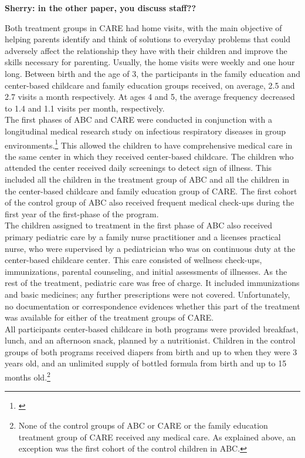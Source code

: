 \textbf{Sherry: in the other paper, you discuss staff??}

\noindent Both treatment groups in CARE had home visits, with the main objective of helping parents identify and think of solutions to everyday problems that could adversely affect the relationship they have with their children and improve the skills necessary for parenting. Usually, the home visits were weekly and one hour long. Between birth and the age of 3, the participants in the family education and center-based childcare and family education groups received, on average, 2.5 and 2.7  visits a month respectively. At ages 4 and 5, the average frequency decreased to 1.4 and 1.1 visits per month, respectively.\\ 

\noindent The first phases of ABC and CARE were conducted in conjunction with a longitudinal medical research study on infectious respiratory diseases in group environments.\footnote{\citet{Henderson-et-al_1982_NEJoM}} This allowed the children to have comprehensive medical care in the same center in which they received center-based childcare. The children who attended the center received daily screenings to detect sign of illness. This included all the children in the treatment group of ABC and all the children in the center-based childcare and family education group of CARE. The first cohort of the control group of ABC also received frequent medical check-ups during the first year of the first-phase of the program.\\

\noindent The children assigned to treatment in the first phase of ABC also received primary pediatric care by a family nurse practitioner and a licenses practical nurse, who were supervised by a pediatrician who was on continuous duty at the center-based childcare center. This care consisted of wellness check-ups, immunizations, parental counseling, and initial assessments of illnesses. As the rest of the treatment, pediatric care was free of charge. It included immunizations and basic medicines; any further prescriptions were not covered. Unfortunately, no documentation or correspondence evidences whether this part of the treatment was available for either of the treatment groups of CARE.\\

\noindent All participants center-based childcare in both programs were provided breakfast, lunch, and an afternoon snack, planned by a nutritionist. Children in the control groups of both programs received diapers from birth and up to when they were 3 years old, and an unlimited supply of bottled formula from birth and up to 15 months old.\footnote{None of the control groups of  ABC or CARE or the family education treatment group of CARE received any medical care. As explained above, an exception was the first cohort of the control children in ABC.}\\

